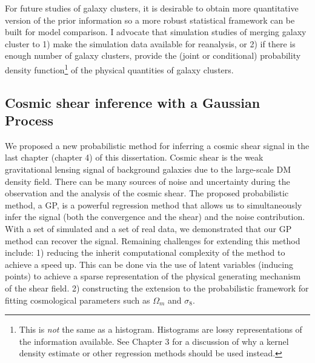 % 
% 

For future studies of galaxy clusters, 
it is desirable to obtain more quantitative version of the 
prior information so a more robust statistical framework can be built for model
comparison. 
I advocate that simulation studies of merging galaxy cluster  
to 1) make the simulation data available for reanalysis, or 2) if there is
enough number of galaxy clusters, provide  the
(joint or conditional) probability density function\footnote{This is {\it not}
the same as a histogram. Histograms are lossy representations of the information 
available. See Chapter 3 for a discussion of why a kernel density estimate or
other regression methods should be used instead.} of the physical quantities
of galaxy clusters. 

\subsection{Cosmic shear inference with a Gaussian Process}
We proposed a new probabilistic method
for inferring a cosmic shear signal in the last chapter (chapter 4) of this dissertation. 
Cosmic shear is the weak 
gravitational lensing signal of background galaxies due to the large-scale DM density field. 
There can be many sources of noise and uncertainty during the observation and
the analysis of the cosmic shear. 
The proposed probabilistic method, a GP, is a powerful regression method that
allows us to simultaneously infer the signal (both the convergence and the shear)
and the noise contribution. 
With a set of simulated and a set of real data, we demonstrated that our GP
method can recover the signal.  
Remaining challenges for extending this method include: 1) reducing the
inherit computational complexity of the method to achieve a speed up. This can
be done via the use of latent variables (inducing points) to achieve a sparse representation of
the physical generating mechanism of the shear field.  
2) constructing the extension to the probabilistic 
framework for fitting cosmological parameters such as $\Omega_m$ and
$\sigma_8$.


